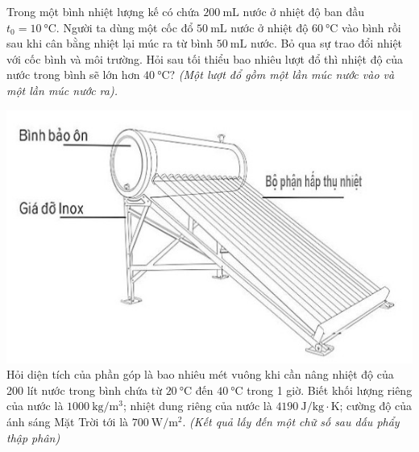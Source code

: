 \begin{ex}
	Trong một bình nhiệt lượng kế có chứa $\SI{200}{\milli\liter}$ nước ở nhiệt độ ban đầu $t_{0}=\SI{10}{\celsius}$. Người ta dùng một cốc đổ $\SI{50}{\milli\liter}$ nước ở nhiệt độ $\SI{60}{\celsius}$ vào bình rồi sau khi cân bằng nhiệt lại múc ra từ bình $\SI{50}{\milli\liter}$ nước. Bỏ qua sự trao đổi nhiệt với cốc bình và môi trường. Hỏi sau tối thiểu bao nhiêu lượt đổ thì nhiệt độ của nước trong bình sẽ lớn hơn $\SI{40}{\celsius}$? 
	\textit{(Một lượt đổ gồm một lần múc nước vào và một lần múc nước ra).}
\end{ex}
\begin{ex}
	{
	\includegraphics[width=0.6\linewidth]{../figs/D12-4-3}
	}
	Hỏi diện tích của phần góp là bao nhiêu mét vuông khi cần nâng nhiệt độ của 200 lít nước trong bình chứa từ $\SI{20}{\celsius}$ đến $\SI{40}{\celsius}$ trong 1 giờ. Biết khối lượng riêng của nước là $\SI{1000}{\kilogram/\meter^3}$; nhiệt dung riêng của nước là $\SI{4190}{\joule/\kilogram\cdot\kelvin}$; cường độ của ánh sáng Mặt Trời tới là $\SI{700}{\watt/\meter^2}$. \textit{(Kết quả lấy đến một chữ số sau dấu phẩy thập phân)}
\end{ex}

